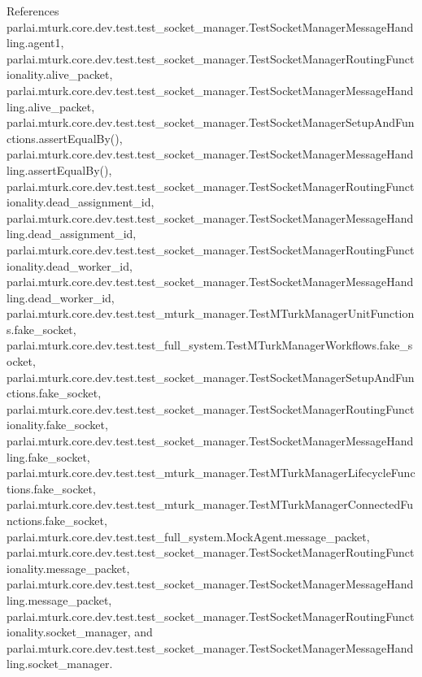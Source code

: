 References parlai.\+mturk.\+core.\+dev.\+test.\+test\+\_\+socket\+\_\+manager.\+Test\+Socket\+Manager\+Message\+Handling.\+agent1, parlai.\+mturk.\+core.\+dev.\+test.\+test\+\_\+socket\+\_\+manager.\+Test\+Socket\+Manager\+Routing\+Functionality.\+alive\+\_\+packet, parlai.\+mturk.\+core.\+dev.\+test.\+test\+\_\+socket\+\_\+manager.\+Test\+Socket\+Manager\+Message\+Handling.\+alive\+\_\+packet, parlai.\+mturk.\+core.\+dev.\+test.\+test\+\_\+socket\+\_\+manager.\+Test\+Socket\+Manager\+Setup\+And\+Functions.\+assert\+Equal\+By(), parlai.\+mturk.\+core.\+dev.\+test.\+test\+\_\+socket\+\_\+manager.\+Test\+Socket\+Manager\+Message\+Handling.\+assert\+Equal\+By(), parlai.\+mturk.\+core.\+dev.\+test.\+test\+\_\+socket\+\_\+manager.\+Test\+Socket\+Manager\+Routing\+Functionality.\+dead\+\_\+assignment\+\_\+id, parlai.\+mturk.\+core.\+dev.\+test.\+test\+\_\+socket\+\_\+manager.\+Test\+Socket\+Manager\+Message\+Handling.\+dead\+\_\+assignment\+\_\+id, parlai.\+mturk.\+core.\+dev.\+test.\+test\+\_\+socket\+\_\+manager.\+Test\+Socket\+Manager\+Routing\+Functionality.\+dead\+\_\+worker\+\_\+id, parlai.\+mturk.\+core.\+dev.\+test.\+test\+\_\+socket\+\_\+manager.\+Test\+Socket\+Manager\+Message\+Handling.\+dead\+\_\+worker\+\_\+id, parlai.\+mturk.\+core.\+dev.\+test.\+test\+\_\+mturk\+\_\+manager.\+Test\+M\+Turk\+Manager\+Unit\+Functions.\+fake\+\_\+socket, parlai.\+mturk.\+core.\+dev.\+test.\+test\+\_\+full\+\_\+system.\+Test\+M\+Turk\+Manager\+Workflows.\+fake\+\_\+socket, parlai.\+mturk.\+core.\+dev.\+test.\+test\+\_\+socket\+\_\+manager.\+Test\+Socket\+Manager\+Setup\+And\+Functions.\+fake\+\_\+socket, parlai.\+mturk.\+core.\+dev.\+test.\+test\+\_\+socket\+\_\+manager.\+Test\+Socket\+Manager\+Routing\+Functionality.\+fake\+\_\+socket, parlai.\+mturk.\+core.\+dev.\+test.\+test\+\_\+socket\+\_\+manager.\+Test\+Socket\+Manager\+Message\+Handling.\+fake\+\_\+socket, parlai.\+mturk.\+core.\+dev.\+test.\+test\+\_\+mturk\+\_\+manager.\+Test\+M\+Turk\+Manager\+Lifecycle\+Functions.\+fake\+\_\+socket, parlai.\+mturk.\+core.\+dev.\+test.\+test\+\_\+mturk\+\_\+manager.\+Test\+M\+Turk\+Manager\+Connected\+Functions.\+fake\+\_\+socket, parlai.\+mturk.\+core.\+dev.\+test.\+test\+\_\+full\+\_\+system.\+Mock\+Agent.\+message\+\_\+packet, parlai.\+mturk.\+core.\+dev.\+test.\+test\+\_\+socket\+\_\+manager.\+Test\+Socket\+Manager\+Routing\+Functionality.\+message\+\_\+packet, parlai.\+mturk.\+core.\+dev.\+test.\+test\+\_\+socket\+\_\+manager.\+Test\+Socket\+Manager\+Message\+Handling.\+message\+\_\+packet, parlai.\+mturk.\+core.\+dev.\+test.\+test\+\_\+socket\+\_\+manager.\+Test\+Socket\+Manager\+Routing\+Functionality.\+socket\+\_\+manager, and parlai.\+mturk.\+core.\+dev.\+test.\+test\+\_\+socket\+\_\+manager.\+Test\+Socket\+Manager\+Message\+Handling.\+socket\+\_\+manager.

